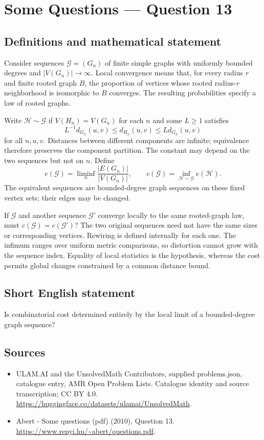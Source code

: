 \documentclass[11pt,a4paper]{article}
\begin{document}
\section*{Some Questions — Question 13}\label{statement}

\subsection{Definitions and mathematical statement}
Consider sequences $\mathcal G=(G_n)$ of finite simple graphs with uniformly bounded degrees and $|V(G_n)|\to\infty$. Local convergence means that, for every radius $r$ and finite rooted graph $B$, the proportion of vertices whose rooted radius-$r$ neighborhood is isomorphic to $B$ converges. The resulting probabilities specify a law of rooted graphs.

Write $\mathcal H\sim\mathcal G$ if $V(H_n)=V(G_n)$ for each $n$ and some $L\geq1$ satisfies
\[
 L^{-1}d_{G_n}(u,v)\leq d_{H_n}(u,v)\leq Ld_{G_n}(u,v)
\]
for all $n,u,v$. Distances between different components are infinite; equivalence therefore preserves the component partition. The constant may depend on the two sequences but not on $n$. Define
\[
 e(\mathcal G)=\liminf_n\frac{|E(G_n)|}{|V(G_n)|},
 \qquad c(\mathcal G)=\inf_{\mathcal H\sim\mathcal G}e(\mathcal H).
\]
The equivalent sequences are bounded-degree graph sequences on these fixed vertex sets; their edges may be changed.

If $\mathcal G$ and another sequence $\mathcal G'$ converge locally to the same rooted-graph law, must $c(\mathcal G)=c(\mathcal G')$? The two original sequences need not have the same sizes or corresponding vertices. Rewiring is defined internally for each one. The infimum ranges over uniform metric comparisons, so distortion cannot grow with the sequence index. Equality of local statistics is the hypothesis, whereas the cost permits global changes constrained by a common distance bound.
\subsection{Short English statement}
Is combinatorial cost determined entirely by the local limit of a bounded-degree graph sequence?
\subsection{Sources}
\begin{itemize}
\item[S1] ULAM.AI and the UnsolvedMath Contributors, supplied problems.json, catalogue entry, AMR Open Problem Lists. Catalogue identity and source transcription; CC BY 4.0.
\url{https://huggingface.co/datasets/ulamai/UnsolvedMath}.
\item[S2] Abert - Some questions (pdf) (2010), Question 13. 
\url{https://www.renyi.hu/~abert/questions.pdf}.
\end{itemize}
\end{document}
